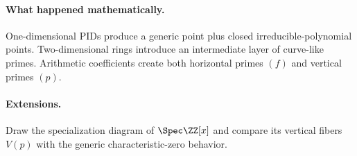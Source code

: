 \paragraph{What happened mathematically.}
One-dimensional PIDs produce a generic point plus closed irreducible-polynomial points.
Two-dimensional rings introduce an intermediate layer of curve-like primes.  Arithmetic
coefficients create both horizontal primes $(f)$ and vertical primes $(p)$.

\paragraph{Extensions.}
Draw the specialization diagram of $\Spec\ZZ[x]$ and compare its vertical fibers $V(p)$
with the generic characteristic-zero behavior.
